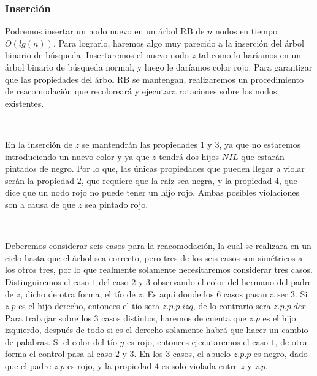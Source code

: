 \subsubsection{Inserci\'on}

Podremos insertar un nodo nuevo en un \'arbol RB de $n$ nodos en tiempo $O(lg(n))$. Para lograrlo, haremos algo muy parecido a la inserci\'on del \'arbol binario de b\'usqueda. Insertaremos el nuevo nodo $z$ tal como lo har\'iamos en un \'arbol binario de b\'usqueda normal, y luego le dar\'iamos color rojo. Para garantizar que las propiedades del \'arbol RB se mantengan, realizaremos un procedimiento de reacomodaci\'on que recolorear\'a y ejecutara rotaciones sobre los nodos existentes.

~

En la inserci\'on de $z$ se mantendr\'an las propiedades $1$ y $3$, ya que no estaremos introduciendo un nuevo color y ya que $z$ tendr\'a dos hijos $NIL$ que estar\'an pintados de negro. Por lo que, las \'unicas propiedades que pueden llegar a violar ser\'an la propiedad $2$, que requiere que la ra\'iz sea negra, y la propiedad $4$, que dice que un nodo rojo no puede tener un hijo rojo. Ambas posibles violaciones son a causa de que $z$ sea pintado rojo.

~

Deberemos considerar seis casos para la reacomodaci\'on, la cual se realizara en un ciclo hasta que el \'arbol sea correcto, pero tres de los seis casos son sim\'etricos a los otros tres, por lo que realmente solamente necesitaremos considerar tres casos. Distinguiremos el caso $1$ del caso $2$ y $3$ observando el color del hermano del padre de $z$, dicho de otra forma, el t\'io de $z$. Es aqu\'i donde los $6$ casos pasan a ser $3$. Si $z.p$ es el hijo derecho, entonces el t\'io sera $z.p.p.izq$, de lo contrario sera $z.p.p.der$. Para trabajar sobre los $3$ casos distintos, haremos de cuenta que $z.p$ es el hijo izquierdo, despu\'es de todo si es el derecho solamente habr\'a que hacer un cambio de palabras. Si el color del t\'io $y$ es rojo, entonces ejecutaremos el caso $1$, de otra forma el control pasa al caso $2$ y $3$. En los $3$ casos, el abuelo $z.p.p$ es negro, dado que el padre $z.p$ es rojo, y la propiedad $4$ es solo violada entre $z$ y $z.p$.

